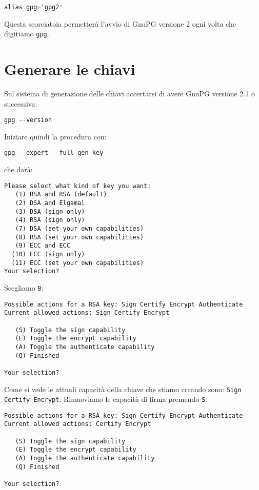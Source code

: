 \begin{lstlisting}
alias gpg='gpg2'
\end{lstlisting}

Questa scorciatoia permetterà l'avvio di GnuPG versione 2 ogni volta che
digitiamo \texttt{gpg}.

\section{Generare le chiavi}

Sul sistema di generazione delle chiavi accertarsi di avere GnuPG versione 2.1 o
successiva:

\begin{lstlisting}
gpg --version
\end{lstlisting}

Iniziare quindi la procedura con:

\begin{lstlisting}
gpg --expert --full-gen-key
\end{lstlisting}

che darà:

\begin{lstlisting}
Please select what kind of key you want:
   (1) RSA and RSA (default)
   (2) DSA and Elgamal
   (3) DSA (sign only)
   (4) RSA (sign only)
   (7) DSA (set your own capabilities)
   (8) RSA (set your own capabilities)
   (9) ECC and ECC
  (10) ECC (sign only)
  (11) ECC (set your own capabilities)
Your selection?
\end{lstlisting}

Scegliamo \texttt{8}:

\begin{lstlisting}
Possible actions for a RSA key: Sign Certify Encrypt Authenticate
Current allowed actions: Sign Certify Encrypt

   (S) Toggle the sign capability
   (E) Toggle the encrypt capability
   (A) Toggle the authenticate capability
   (Q) Finished

Your selection?
\end{lstlisting}

Come si vede le attuali capacità della chiave che stiamo creando sono:
\texttt{Sign Certify Encrypt}. Rimuoviamo le capacità di firma premendo
\texttt{S}:

\begin{lstlisting}
Possible actions for a RSA key: Sign Certify Encrypt Authenticate
Current allowed actions: Certify Encrypt

   (S) Toggle the sign capability
   (E) Toggle the encrypt capability
   (A) Toggle the authenticate capability
   (Q) Finished

Your selection?
\end{lstlisting}

